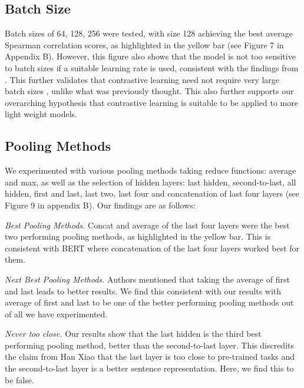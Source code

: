 \documentclass[10pt,twocolumn,letterpaper]{article}
\begin{document}
\subsection{Batch Size}

Batch sizes of 64, 128, 256 were tested, with size 128 achieving the best average Spearman correlation scores, as highlighted in the yellow bar (see Figure 7 in Appendix B). However, this figure also shows that the model is not too sensitive to batch sizes if a suitable learning rate is used, consistent with the findings from \cite{2104.08821}. This further validates that contrastive learning need not require very large batch sizes \cite{2104.08821}, unlike what was previously thought\cite{2002.05709}. This also further supports our overarching hypothesis that contrastive learning is suitable to be applied to more light weight models.

\subsection{Pooling Methods}

We experimented with various pooling methods taking reduce functions: average and max, as well as the selection of hidden layers: last hidden, second-to-last, all hidden, first and last, last two, last four and concatenation of last four layers (see Figure 9 in appendix B). Our findings are as follows:

\textit{Best Pooling Methods.} Concat and average of the last four layers were the best two performing pooling methods, as highlighted in the yellow bar. This is consistent with BERT \cite{1907.11692} where concatenation of the last four layers worked best for them.

\textit{Next Best Pooling Methods.} Authors \cite{li-etal-2020-sentence} \cite{https://doi.org/10.48550/arxiv.1908.10084} mentioned that taking the average of first and last leads to better results. We find this consistent with our results with average of first and last to be one of the better performing pooling methods out of all we have experimented.

\textit{Never too close.} Our results show that the last hidden is the third best performing pooling method, better than the second-to-last layer. This discredits the claim from Han Xiao \cite{bert.as.service} that the last layer is too close to pre-trained tasks and the second-to-last layer is a better sentence representation. Here, we find this to be false.
\end{document}
